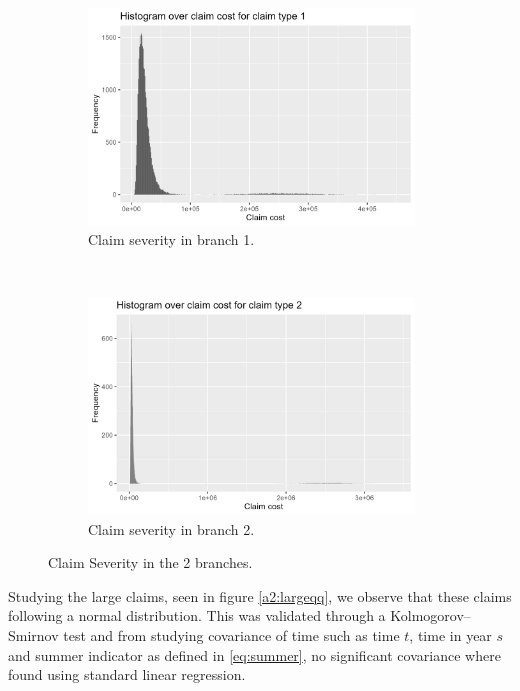 \documentclass[11pt]{article}
\begin{document}
\begin{figure}[t!]
    \centering
    \begin{subfigure}[t]{0.5\textwidth}
        \centering
        \includegraphics[width=0.95\textwidth]{plots/claim_type1/histogram_claimcost.png}
        \caption{Claim severity in branch 1.}
    \end{subfigure}%
    ~ 
    \begin{subfigure}[t]{0.5\textwidth}
        \centering
        \includegraphics[width=0.95\textwidth]{plots/claim_type2/histogram_claimcost_2.png}
        \caption{Claim severity in branch 2.}
    \end{subfigure}
    \caption{Claim Severity in the 2 branches.}
    \label{a2:severity}
\end{figure}

Studying the large claims, seen in figure \ref{a2:largeqq}, we observe that these claims following a normal distribution.
This was validated through a Kolmogorov–Smirnov test and from studying covariance of time such as time $t$, time in year $s$ and summer indicator as defined in \ref{eq:summer}, no significant covariance where found using standard linear regression.
\end{document}
